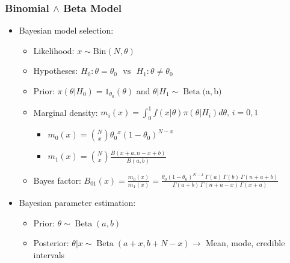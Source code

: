 \begin{frame} 
	\frametitle{Binomial $\land$ Beta Model}

\begin{itemize}

\item Bayesian model selection:

\begin{itemize}

\item Likelihood: $x \sim \text{Bin}(N, \theta)$

\item  Hypotheses: $ H_0: {\theta}={\theta_0} \,\,\,\, \text{vs} \,\,\,\,  H_1: {\theta} \neq \theta_0$

\item Prior: $\pi(\theta|H_0)={1_{\theta_0}(\theta)}$ and $\theta| H_1 \sim \operatorname{Beta}($a$,$b$) $

\item Marginal density: $m_i(x)= \int_0^1 f(x|\theta)\pi(\theta|H_i)d \theta, \,  i=0, 1$

\begin{itemize}

\item $m_0(x)=\binom{N}{x} {\theta_0}^{x}{(1-\theta_0)}^{N-x}$ 

\item  $m_1(x) = \binom{N}{x}\frac{B(x+a, n-x+b)}{B(a,b)}$

\end{itemize}

\item Bayes factor: $B_{01}(x) = \frac{m_0(x)}{m_1(x)}  = \frac{\theta_0(1-\theta_0)^{N-x}\,\Gamma(a)\,\Gamma(b)\,\Gamma(n+a+b)}{\Gamma(a+b)\,\Gamma(n+a-x)\,\Gamma(x+a)}$ 

\end{itemize}

\item  Bayesian parameter estimation:

\begin{itemize}

\item Prior: $\theta \sim \operatorname{Beta}(a,b) $

\item Posterior: $\theta | x \sim \operatorname{Beta}(a+x, b+N-x ) \rightarrow$ Mean, mode, credible intervals

\end{itemize}

\end{itemize}

\end{frame}
